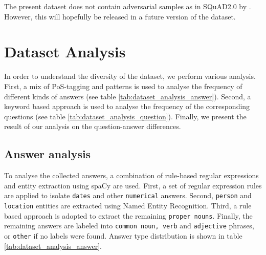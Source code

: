 \documentclass{article}
\begin{document}
The present dataset does not contain adversarial samples as in SQuAD2.0 by \citep{rajpurkar-squad-v2}.
However, this will hopefully be released in a future version of the dataset.




 
\section{Dataset Analysis}
\label{section:dataset_analysis}
In order to understand the diversity of the dataset, we perform various analysis.
First, a mix of PoS-tagging and patterns is used to analyse the frequency of different kinds of answers (see table \ref{tab:dataset_analysis_answer}).
Second, a keyword based approach is used to analyse the frequency of the corresponding questions (see table \ref{tab:dataset_analysis_question}).
Finally, we present the result of our analysis on the question-answer differences.

\subsection{Answer analysis}

To analyse the collected answers, a combination of rule-based regular expressions and entity extraction using spaCy \citep{spacy2} are used.
First, a set of regular expression rules are applied to isolate \texttt{dates} and other \texttt{numerical} answers.
Second, \texttt{person} and \texttt{location} entities are extracted using Named Entity Recognition. 
Third, a rule based approach is adopted to extract the remaining \texttt{proper nouns}. 
Finally, the remaining answers are labeled into \texttt{common noun, verb} and \texttt{adjective} phrases, or \texttt{other} if no labels were found. 
Answer type distribution is shown in table \ref{tab:dataset_analysis_answer}.
\end{document}

